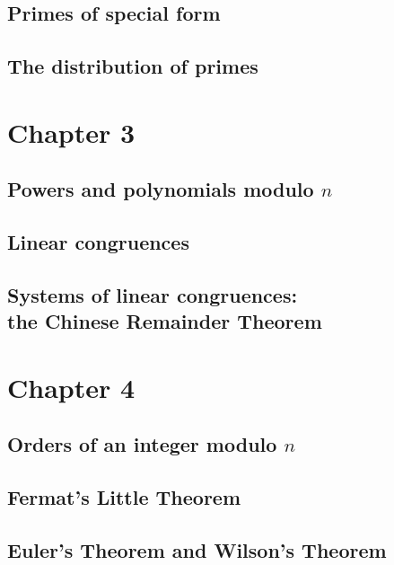 \documentclass{article}
\numberwithin{equation}{thm}
\begin{document}



\subsection*{Primes of special form}




\subsection*{The distribution of primes}





\pagebreak



\section{Chapter 3}


\subsection*{Powers and polynomials modulo $n$}




\subsection*{Linear congruences}




\subsection*{Systems of linear congruences: \\ the Chinese Remainder Theorem}





\pagebreak



\section{Chapter 4}


\subsection*{Orders of an integer modulo $n$}




\subsection*{Fermat's Little Theorem}




\subsection*{Euler's Theorem and Wilson's Theorem}

\setcounter{thm}{26}


\end{document}
